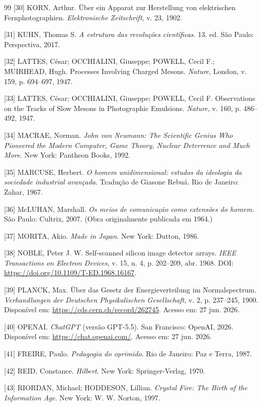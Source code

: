 \documentclass{hipatia}
\begin{document}
{\begin{thebibliography}{99}
[30]
KORN, Arthur.
Über ein Apparat zur Herstellung von elektrischen Fernphotographien.
\textit{Elektronische Zeitschrift},
v. 23,
1902.

[31]
KUHN, Thomas S.
\textit{A estrutura das revoluções científicas}.
13. ed.
São Paulo: Perspectiva, 2017.

[32]
LATTES, César; OCCHIALINI, Giuseppe; POWELL, Cecil F.; MUIRHEAD, Hugh.
Processes Involving Charged Mesons.
\textit{Nature},
London,
v. 159,
p. 694--697,
1947.

[33]
LATTES, César; OCCHIALINI, Giuseppe; POWELL, Cecil F.
Observations on the Tracks of Slow Mesons in Photographic Emulsions.
\textit{Nature},
v. 160,
p. 486--492,
1947.

[34]
MACRAE, Norman.
\textit{John von Neumann: The Scientific Genius Who Pioneered the Modern Computer, Game Theory, Nuclear Deterrence and Much More}.
New York: Pantheon Books, 1992.

[35]
MARCUSE, Herbert.
\textit{O homem unidimensional: estudos da ideologia da sociedade industrial avançada}.
Tradução de Giasone Rebuá.
Rio de Janeiro: Zahar, 1967.

[36]
McLUHAN, Marshall.
\textit{Os meios de comunicação como extensões do homem}.
São Paulo: Cultrix, 2007.
(Obra originalmente publicada em 1964.)

[37]
MORITA, Akio.
\textit{Made in Japan}.
New York: Dutton, 1986.

[38]
NOBLE, Peter J. W.
Self-scanned silicon image detector arrays.
\textit{IEEE Transactions on Electron Devices},
v. 15,
n. 4,
p. 202--209,
abr. 1968.
DOI:
\url{https://doi.org/10.1109/T-ED.1968.16167}.

[39]
PLANCK, Max.
Über das Gesetz der Energieverteilung im Normalspectrum.
\textit{Verhandlungen der Deutschen Physikalischen Gesellschaft},
v. 2,
p. 237--245,
1900.
Disponível em:
\url{https://cds.cern.ch/record/262745}.
Acesso em: 27 jun. 2026.

[40]
OPENAI.
\textit{ChatGPT} (versão GPT-5.5).
San Francisco: OpenAI, 2026.
Disponível em:
\url{https://chat.openai.com/}.
Acesso em: 27 jun. 2026.

[41]
FREIRE, Paulo.
\textit{Pedagogia do oprimido}.
Rio de Janeiro: Paz e Terra, 1987.

[42]
REID, Constance.
\textit{Hilbert}.
New York: Springer-Verlag, 1970.

[43]
RIORDAN, Michael; HODDESON, Lillian.
\textit{Crystal Fire: The Birth of the Information Age}.
New York: W. W. Norton, 1997.


\end{thebibliography}}
\end{document}
